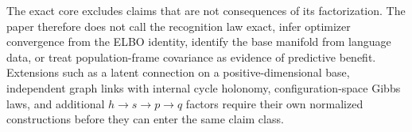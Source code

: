 The exact core excludes claims that are not consequences of its factorization. The paper therefore does not call the recognition law exact, infer optimizer convergence from the ELBO identity, identify the base manifold from language data, or treat population-frame covariance as evidence of predictive benefit. Extensions such as a latent connection on a positive-dimensional base, independent graph links with internal cycle holonomy, configuration-space Gibbs laws, and additional \(h\to s\to p\to q\) factors require their own normalized constructions before they can enter the same claim class.
